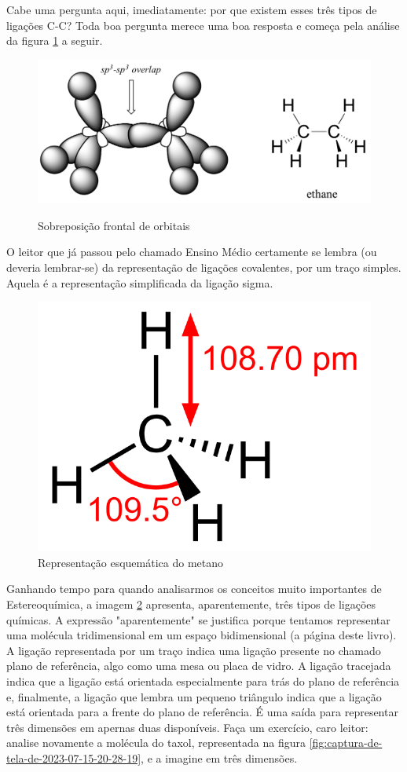\documentclass[a4paper,12pt]{book}
\begin{document}
Cabe uma pergunta aqui, imediatamente: por que existem esses três tipos de ligações C-C? Toda boa pergunta merece uma boa resposta e começa pela análise da figura \ref*{fig:sigma} a seguir.

\begin{figure}[h]
	\centering
	\caption{Sobreposição frontal de orbitais}
	\includegraphics[width=0.5\linewidth]{imagens/sp3overlap.jpg}
	\label{fig:sigma}
\end{figure}

O leitor que já passou pelo chamado Ensino Médio certamente se lembra (ou deveria lembrar-se) da representação de ligações covalentes, por um traço simples. Aquela é a representação simplificada da ligação sigma.

\begin{figure}[h]
	\centering
	\caption{Representação esquemática do metano}
	\label{fig:metano}
	\includegraphics[width=0.4\linewidth]{imagens/Methane-2D-dimensions.svg.png}
\end{figure}

Ganhando tempo para quando analisarmos os conceitos muito importantes de Estereoquímica, a imagem \ref{fig:metano} apresenta, aparentemente, três tipos de ligações químicas. A expressão "aparentemente" se justifica porque tentamos representar uma molécula tridimensional em um espaço bidimensional (a página deste livro). A ligação representada por um traço indica uma ligação presente no chamado plano de referência, algo como uma mesa ou placa de vidro. A ligação tracejada indica que a ligação está orientada especialmente para trás do plano de referência e, finalmente, a ligação que lembra um pequeno triângulo indica que a ligação está orientada para a frente do plano de referência. É uma saída para representar três dimensões em apernas duas disponíveis. Faça um exercício, caro leitor: analise novamente a molécula do taxol, representada na figura \ref{fig:captura-de-tela-de-2023-07-15-20-28-19}, e a imagine em três dimensões.
\end{document}
